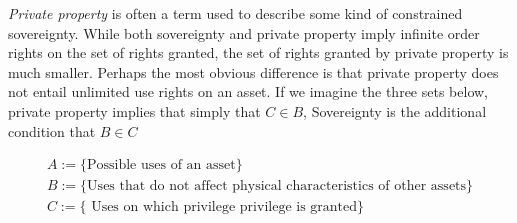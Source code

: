 \documentclass[12pt]{article}
\numberwithin{equation}{section}
\begin{document}
\textit{Private property} is often a term used to describe some kind of constrained sovereignty. While both sovereignty and private property imply infinite order rights on the set of rights granted, the set of rights granted by private property is much smaller. Perhaps the most obvious difference is that private property does not entail unlimited use rights on an asset. If we imagine the three sets below, private property implies that simply that $C\in B$, Sovereignty is the additional condition that $B \in C$


\begin{align*}
A:=\{ \text{Possible uses of an asset} \} \\
B:=\{\text{Uses that do not affect physical characteristics of other assets} \} \\
C:=\{\text{ Uses on which privilege privilege is granted}\}
\end{align*}
\end{document}

